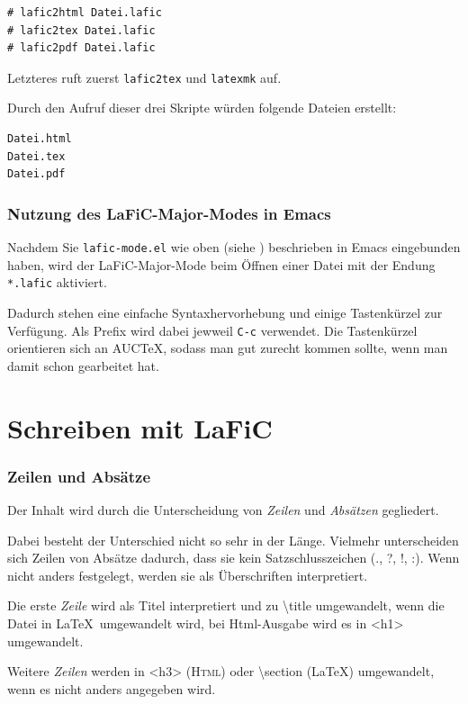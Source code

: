 \documentclass{scrartcl}
\begin{document}
\begin{verbatim}
# lafic2html Datei.lafic
# lafic2tex Datei.lafic
# lafic2pdf Datei.lafic
\end{verbatim}


Letzteres ruft zuerst \texttt{lafic2tex} und \texttt{latexmk} auf.

Durch den Aufruf dieser drei Skripte würden folgende Dateien
erstellt:

\begin{verbatim}
Datei.html
Datei.tex
Datei.pdf
\end{verbatim}


\section{Nutzung des LaFiC-Major-Modes in Emacs}

Nachdem Sie \texttt{lafic-mode.el} wie oben (siehe \xspace )
beschrieben in Emacs eingebunden haben, wird der
LaFiC-Major-Mode beim Öffnen einer Datei mit der Endung
\texttt{*.lafic} aktiviert.

Dadurch stehen eine einfache Syntaxhervorhebung und einige
Tastenkürzel zur Verfügung. Als Prefix wird dabei jewweil
\texttt{C-c} verwendet. Die Tastenkürzel orientieren sich an AUCTeX,
sodass man gut zurecht kommen sollte, wenn man damit schon
gearbeitet hat.

\part{Schreiben mit LaFiC}

\section{Zeilen und Absätze}

Der Inhalt wird durch die Unterscheidung von \emph{Zeilen} und
\emph{Absätzen} gegliedert.

Dabei besteht der Unterschied nicht so sehr in der
Länge. Vielmehr unterscheiden sich Zeilen von Absätze
dadurch, dass sie kein Satzschlusszeichen (., ?, !, :).
Wenn nicht anders festgelegt, werden sie als Überschriften
interpretiert.

Die erste \emph{Zeile} wird als Titel interpretiert und zu \textbackslash title
umgewandelt, wenn die Datei in \LaTeX\  umgewandelt wird, bei
Html-Ausgabe wird es in <h1> umgewandelt.

Weitere \emph{Zeilen} werden in <h3> (\textsc{Html}) oder \textbackslash section
(LaTeX) umgewandelt, wenn es nicht anders angegeben wird.
\end{document}
